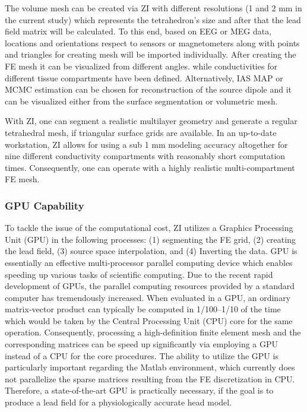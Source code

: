 \documentclass[5p]{elsarticle}
\begin{document}
The volume mesh can be created via ZI with different resolutions (1 and 2 mm in the current study) which represents the tetrahedron's size and after that the lead field matrix will be calculated. To this end, based on EEG or MEG data, locations and orientations respect to sensors or magnetometers along with points and triangles for creating mesh will be imported individually. After creating the FE mesh it can be visualized from different angles. while conductivities for different tissue compartments have been defined. Alternatively, IAS MAP or MCMC estimation can be chosen for reconstruction of the source dipole and it can be visualized either from the surface segmentation or volumetric mesh. 

With ZI, one can segment a realistic multilayer geometry and generate a regular tetrahedral mesh, if triangular surface grids are available. In an up-to-date workstation, ZI allows for using a sub 1 mm modeling accuracy altogether for nine different conductivity compartments with reasonably short computation times.  Consequently, one can operate with a highly  realistic multi-compartment FE mesh.  

\subsubsection{GPU Capability} 

To tackle the issue of the computational cost, ZI utilizes a Graphics Processing Unit (GPU) in the following processes: (1)  segmenting the FE grid, (2) creating the lead field, (3)  source space interpolation, and (4) Inverting the data.  GPU is essentially an effective multi-processor parallel computing device which enables speeding up various tasks of scientific computing. Due  to the recent rapid development of GPUs, the parallel computing resources provided by a standard computer has tremendously increased. When evaluated in a GPU, an ordinary matrix-vector product can typically be computed in 1/100--1/10 of the time which would be taken by the Central Processing Unit (CPU) core for the same operation. Consequently, processing a high-definition finite element mesh and the corresponding matrices can be speed up significantly via employing a GPU instead of a CPU for the core procedures.  The ability to utilize the GPU is particularly important regarding the Matlab environment, which currently does not parallelize the sparse matrices resulting from the FE discretization in CPU. Therefore, a state-of-the-art GPU is practically necessary, if the goal is to produce a lead field for a physiologically accurate head model. 
\end{document}
